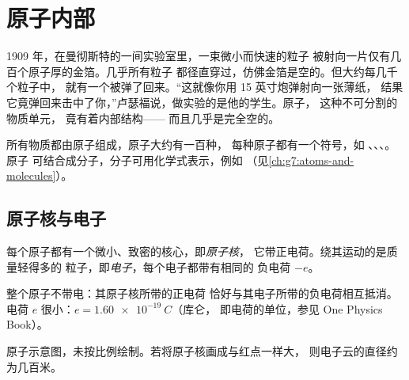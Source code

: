 \chapter{原子内部}\label{ch:g9:inside-the-atom}

1909 年，在曼彻斯特的一间实验室里，一束微小而快速的粒子
被射向一片仅有几百个原子厚的金箔。几乎所有粒子
都径直穿过，仿佛金箔是空的。但大约每几千个粒子中，
就有一个被弹了回来。“这就像你用 15 英寸炮弹射向一张薄纸，
结果它竟弹回来击中了你，”卢瑟福说，做实验的是他的学生。原子，
这种不可分割的物质单元，
竟有着内部结构——
而且几乎是完全空的。

\begin{recall}
所有物质都由原子组成，原子大约有一百种，
每种原子都有一个符号，如 、、、。原子
可结合成分子，分子可用化学式表示，例如 
（见\cref{ch:g7:atoms-and-molecules}）。
\end{recall}

\section{原子核与电子}

\begin{definition}[原子核与电子]\label{def:g9:inside-the-atom:nucleus}
每个原子都有一个微小、致密的核心，即\emph{原子核}，
它带正电荷。绕其运动的是质量轻得多的
粒子，即\emph{电子}，每个电子都带有相同的
负电荷 $-e$。
\end{definition}

\begin{proposition}[原子呈电中性]\label{prop:g9:inside-the-atom:neutral}
整个原子不带电：其原子核所带的正电荷
恰好与其电子所带的负电荷相互抵消。
电荷 $e$ 很小：$e = \qty{1.60e-19}{C}$（库仑，
即电荷的单位，参见 One Physics Book）。
\end{proposition}

\begin{omfigure}

{\small 原子示意图，未按比例绘制。若将原子核画成与红点一样大，
则电子云的直径约为几百米。}
\end{omfigure}

